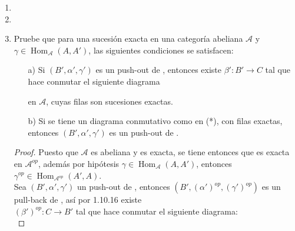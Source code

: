 \documentclass{article}
\begin{document}
\begin{enumerate}[label=\textbf{Ej \arabic*.}]
\begin{proof}
Ahora, si $f_2$ y $f_4$ son epi y $f_5$ es mono, entonces $f_2^{op}$ y $f_4^{op}$ son monos y $f_5^{op}$ es epi, así por el inciso a) se tiene 
que $f_3^{op}$ es mono lo cual implica que $f_3$ es epi.

\end{proof}

\item
\item

\item Pruebe que para una sucesión exacta  en una categoría abeliana $\mathscr{A}$
y $\gamma \in \operatorname{Hom}_{\mathscr{A}}(A,A')$, las siguientes condiciones se satisfacen:

\begin{itemize}
\item[a)] Si $(B',\alpha',\gamma')$ es un push-out de , entonces existe $\beta':B'\to C$ tal que 
hace conmutar el siguiente diagrama\\
\centerline{
}
en $\mathscr{A}$, cuyas filas son sucesiones exactas.
\item[b)] Si se tiene un diagrama conmutativo como en (*), con filas exactas, entonces $(B',\alpha',\gamma')$ es un push-out de
 .
\end{itemize}

\begin{proof}

Puesto que $\mathscr{A}$ es abeliana y   es exacta, se tiene entonces que 
 es exacta en $\mathscr{A}^{op}$, además por hipótesis 
$\gamma\in \operatorname{Hom}_\mathscr{A}(A,A')$, entonces \\$\gamma^{op}\in \operatorname{Hom}_{\mathscr{A}^{op}}(A',A)$.\\

Sea $(B',\alpha',\gamma')$ un push-out de , entonces 
$(B',(\alpha')^{op},(\gamma')^{op})$ es un pull-back de , así por 1.10.16
existe \\$(\beta')^{op}:C\to B'$ tal que hace conmutar el siguiente diagrama:\\


\end{proof}
\end{enumerate}
\end{document}
